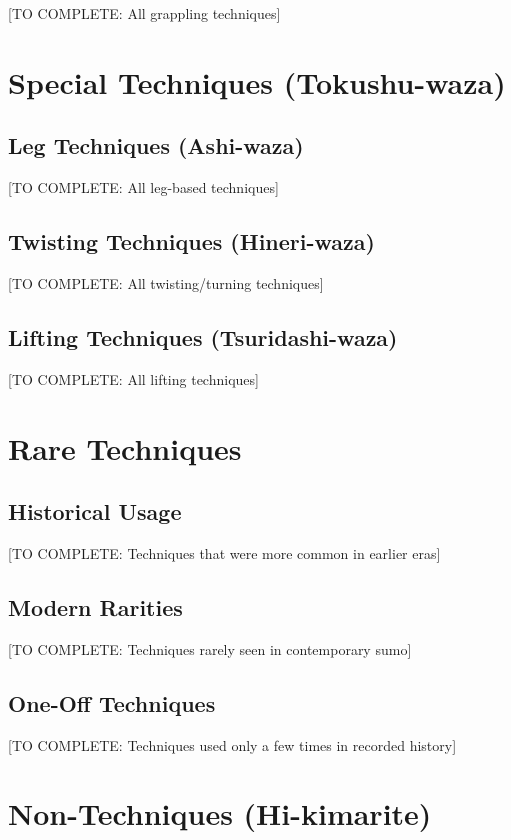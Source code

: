 [TO COMPLETE: All grappling techniques]

\section{Special Techniques (Tokushu-waza)}

\subsection{Leg Techniques (Ashi-waza)}

[TO COMPLETE: All leg-based techniques]

\subsection{Twisting Techniques (Hineri-waza)}

[TO COMPLETE: All twisting/turning techniques]

\subsection{Lifting Techniques (Tsuridashi-waza)}

[TO COMPLETE: All lifting techniques]

\section{Rare Techniques}

\subsection{Historical Usage}

[TO COMPLETE: Techniques that were more common in earlier eras]

\subsection{Modern Rarities}

[TO COMPLETE: Techniques rarely seen in contemporary sumo]

\subsection{One-Off Techniques}

[TO COMPLETE: Techniques used only a few times in recorded history]

\section{Non-Techniques (Hi-kimarite)}

